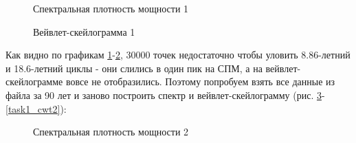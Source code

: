 \documentclass[a4paper,oneside,14pt]{extreport}
\begin{document}
\begin{figure}[!h]
	\caption{Спектральная плотность мощности 1}
	\label{task1_spectr1}
\end{figure}

\begin{figure}[!h]
	\caption{Вейвлет-скейлограмма 1}
	\label{task1_cwt1}
\end{figure}

Как видно по графикам \ref{task1_spectr1}-\ref{task1_cwt1}, 30000 точек недостаточно чтобы уловить 8.86-летний и 18.6-летний циклы - они слились в один пик на СПМ, а на вейвлет-скейлограмме вовсе не отобразились. Поэтому попробуем взять все данные из файла за 90 лет и заново построить спектр и вейвлет-скейлограмму (рис. \ref{task1_spectr2}-\ref{task1_cwt2}):

\newpage
\begin{figure}[!h]
	\caption{Спектральная плотность мощности 2}
	\label{task1_spectr2}
\end{figure}
\end{document}
